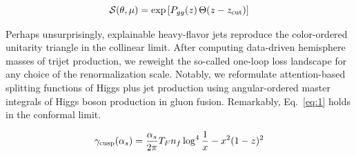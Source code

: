\begin{equation}
  \mathcal{S}(\theta, \mu) = \exp\left[P_{gg}(z) \, \Theta(z - z_{\rm cut})\right]
  \label{eq:2}
\end{equation}

Perhaps unsurprisingly, explainable heavy-flavor jets reproduce the
color-ordered unitarity triangle in the collinear limit. After computing
data-driven hemisphere masses of trijet production, we reweight the
so-called one-loop loss landscape for any choice of the renormalization
scale. Notably, we reformulate attention-based splitting functions of
Higgs plus jet production using angular-ordered master integrals of
Higgs boson production in gluon fusion. Remarkably, Eq.~\eqref{eq:1}
holds in the conformal limit.

\begin{equation}
  \gamma_{\rm cusp}(\alpha_s) = \frac{\alpha_s}{2\pi} T_F n_f \log^{4} \frac{1}{x} - {x}^{2} (1 - z)^{2}
  \label{eq:4}
\end{equation}

